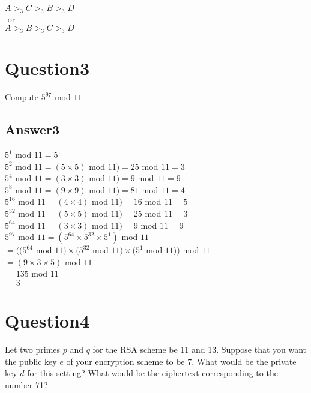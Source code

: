 \documentclass[twoside]{article}
\begin{document}
$A >_{3} C >_{3} B >_{3} D$ \\
\hspace*{13mm}-or-\\
$A >_{3} B >_{3} C >_{3} D$ \\


\section{Question3}

Compute $5^{97}$ mod $11$.

\subsection{Answer3}

$5^{1}$ mod $11 = 5$ \\
$5^{2}$ mod $11 = (5 \times 5)$ mod $11) = 25$ mod $11 = 3$ \\
$5^{4}$ mod $11 = (3 \times 3)$ mod $11) = 9$ mod $11 = 9$ \\
$5^{8}$ mod $11 = (9 \times 9)$ mod $11) = 81$ mod $11 = 4$ \\
$5^{16}$ mod $11 = (4 \times 4)$ mod $11) = 16$ mod $11 = 5$ \\
$5^{32}$ mod $11 = (5 \times 5)$ mod $11) = 25$ mod $11 = 3$ \\
$5^{64}$ mod $11 = (3 \times 3)$ mod $11) = 9$ mod $11 = 9$ \\

$5^{97}$ mod $11 = (5^{64} \times 5^{32} \times 5^{1})$ mod $11$\\ \hspace*{17mm} $= ((5^{64}$ mod $11) \times (5^{32}$ mod $11) \times (5^{1}$ mod $11))$ mod $11$  \\
\hspace*{17mm} $= (9 \times 3 \times 5)$ mod $11$ \\
\hspace*{17mm} $= 135$ mod $11$ \\
\hspace*{17mm} $= 3$ \\

\section{Question4}

Let two primes $p$ and $q$ for the RSA scheme be 11 and 13. Suppose that you want the public key $e$ of your encryption scheme to be 7. What would be the private key $d$ for this setting? What would be the ciphertext corresponding to the number 71?
\end{document}
